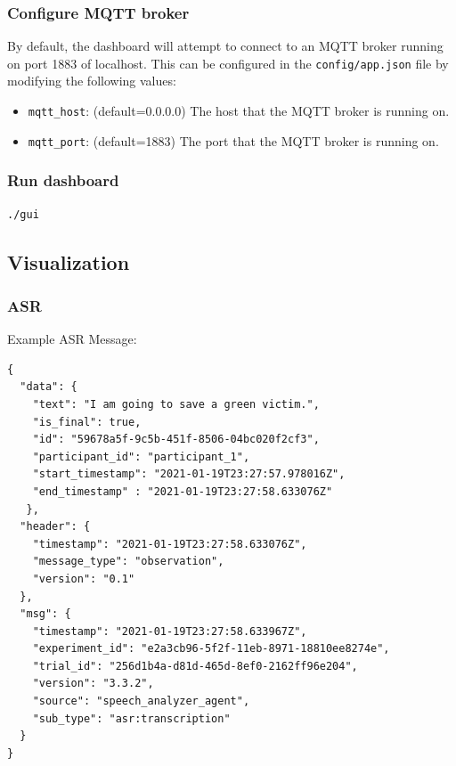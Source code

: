 \subsubsection{Configure MQTT broker}

By default, the dashboard will attempt to connect to an MQTT broker running on
port 1883 of localhost. This can be configured in the \texttt{config/app.json} file by
modifying the following values:

\begin{itemize}

    \item \texttt{mqtt\_host}: (default=0.0.0.0) The host that the MQTT broker
        is running on.

    \item \texttt{mqtt\_port}: (default=1883) The port that the MQTT broker is
        running on.

\end{itemize}

\subsubsection{Run dashboard}

\begin{verbatim}
./gui
\end{verbatim}



\subsection{Visualization}

\subsubsection{ASR}

Example ASR Message:

\begin{verbatim}
{
  "data": {
    "text": "I am going to save a green victim.",
    "is_final": true,
    "id": "59678a5f-9c5b-451f-8506-04bc020f2cf3",
    "participant_id": "participant_1",
    "start_timestamp": "2021-01-19T23:27:57.978016Z",
    "end_timestamp" : "2021-01-19T23:27:58.633076Z"
   },
  "header": {
    "timestamp": "2021-01-19T23:27:58.633076Z",
    "message_type": "observation",
    "version": "0.1"
  },
  "msg": {
    "timestamp": "2021-01-19T23:27:58.633967Z",
    "experiment_id": "e2a3cb96-5f2f-11eb-8971-18810ee8274e",
    "trial_id": "256d1b4a-d81d-465d-8ef0-2162ff96e204",
    "version": "3.3.2",
    "source": "speech_analyzer_agent",
    "sub_type": "asr:transcription"
  }
}
\end{verbatim}


